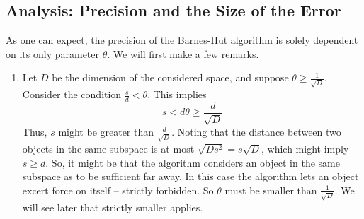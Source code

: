 \subsection{Analysis: Precision and the Size of the Error}
As one can expect, the precision of the Barnes-Hut algorithm is solely dependent on its only parameter $\theta$. We will first make a few remarks.
\begin{enumerate}
\item Let $D$ be the dimension of the considered space, and suppose $\theta \geq \frac{1}{\sqrt{D}}$. Consider the condition $\frac{s}{d} < \theta$. This implies
\[
s < d\theta \geq \frac{d}{\sqrt{D}}
\]
Thus, $s$ might be greater than $\frac{d}{\sqrt{D}}$. Noting that the distance between two objects in the same subspace is at most $\sqrt{Ds^2} = s\sqrt{D}$, which might imply $s\geq d$. So, it might be that the algorithm considers an object in the same subspace as to be sufficient far away. In this case the algorithm lets an object excert force on itself -- strictly forbidden. So $\theta$ must be smaller than $\frac{1}{\sqrt{D}}$. We will see later that strictly smaller applies.


\end{enumerate}
